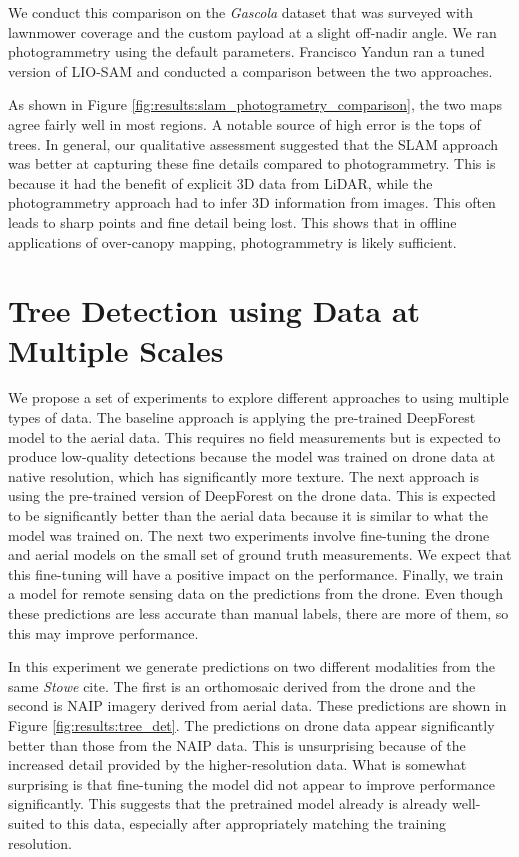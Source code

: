 We conduct this comparison on the \textit{Gascola} dataset that was surveyed with lawnmower coverage and the custom payload at a slight off-nadir angle. We ran photogrammetry using the default parameters. Francisco Yandun ran a tuned version of LIO-SAM \cite{Shan2020LIO-SAM:Mapping} and conducted a comparison between the two approaches.

As shown in Figure \ref{fig:results:slam_photogrametry_comparison}, the two maps agree fairly well in most regions. A notable source of high error is the tops of trees. In general, our qualitative assessment suggested that the SLAM approach was better at capturing these fine details compared to photogrammetry. This is because it had the benefit of explicit 3D data from LiDAR, while the photogrammetry approach had to infer 3D information from images. This often leads to sharp points and fine detail being lost. This shows that in offline applications of over-canopy mapping, photogrammetry is likely sufficient. 

\section{Tree Detection using Data at Multiple Scales}
We propose a set of experiments to explore different approaches to using multiple types of data. The baseline approach is applying the pre-trained DeepForest model to the aerial data. This requires no field measurements but is expected to produce low-quality detections because the model was trained on drone data at native resolution, which has significantly more texture. The next approach is using the pre-trained version of DeepForest on the drone data. This is expected to be significantly better than the aerial data because it is similar to what the model was trained on. The next two experiments involve fine-tuning the drone and aerial models on the small set of ground truth measurements. We expect that this fine-tuning will have a positive impact on the performance. Finally, we train a model for remote sensing data on the predictions from the drone. Even though these predictions are less accurate than manual labels, there are more of them, so this may improve performance.

In this experiment we generate predictions on two different modalities from the same \textit{Stowe} cite. The first is an orthomosaic derived from the drone and the second is NAIP imagery derived from aerial data. These predictions are shown in Figure \ref{fig:results:tree_det}. The predictions on drone data appear significantly better than those from the NAIP data. This is unsurprising because of the increased detail provided by the higher-resolution data. What is somewhat surprising is that fine-tuning the model did not appear to improve performance significantly. This suggests that the pretrained model already is already well-suited to this data, especially after appropriately matching the training resolution.

